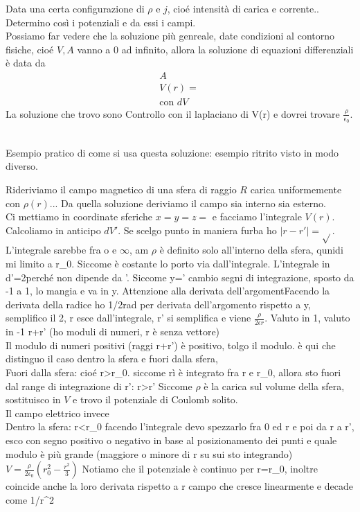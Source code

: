 \begin{equatino*}
Data una certa configurazione di $\rho$ e $j$, cioé intensità di carica e corrente.. Determino così i potenziali e da essi i campi.\\

Possiamo far vedere che la soluzione più genreale, date condizioni al contorno fisiche, cioé $V,A$ vanno a $0$ ad infinito, allora la soluzione di equazioni differenziali è data da
\begin{gather*}
	A\\
	V(r)=\frac{}{}\\
	\text{con } dV
	
\end{gather*}
La soluzione che trovo sono 
Controllo con il laplaciano di V(r) e dovrei trovare $\frac{\rho}{\epsilon_0}$.

\\

Esempio pratico di come si usa questa soluzione: esempio ritrito visto in modo diverso. 
\begin{example}
	Rideriviamo il campo magnetico di una sfera di raggio $R$ carica uniformemente con $\rho(r)..$. Da quella soluzione deriviamo il campo sia interno sia esterno.\\
	Ci mettiamo in coordinate sferiche $x= y= z=$ e facciamo l'integrale $V(r)$. Calcoliamo in anticipo $dV'$. Se scelgo punto in maniera furba ho $|r-r'|=\sqrt{}$. L'integrale sarebbe fra o e $\infty$, am $\rho$ è definito solo all'interno della sfera, qunidi mi limito a r_0. Siccome \rho è costante lo porto via dall'integrale. L'integrale in d\phi'=2\pi perché non dipende da \phi'. Siccome y=\cos\theta'  cambio segni di integrazione, sposto da -1 a 1, lo mangia e va in y. Attenzione alla derivata dell'argomentFacendo la derivata della radice ho 1/2rad per derivata dell'argomento rispetto a y, semplifico il 2, r esce dall'integrale, r' si semplifica e viene $\frac{\rho}{2\epsilon r}$. Valuto in 1, valuto in -1 r+r'  (ho moduli di numeri, r è senza vettore)\\
	Il modulo di numeri positivi (raggi r+r') è positivo, tolgo il modulo. è qui che distinguo il caso dentro la sfera e fuori dalla sfera,	\\
	Fuori dalla sfera:  cioé r>r_0. siccome rì è integrato fra r e r_0, allora sto fuori dal range di integrazione di r': r>r'
	Siccome $\rho$ è la carica sul volume della sfera, sostituisco in $V$ e trovo il potenziale di Coulomb solito. \\
	Il campo elettrico invece
	\\
	Dentro la sfera: r<r_0 facendo l'integrale devo spezzarlo fra 0 ed r e poi da r a r', esco con segno positivo o negativo in base al posizionamento dei punti e quale modulo è più grande (maggiore  o minore di r su sui sto integrando)		$V=\frac{\rho}{2\epsilon_0}\left( r_0^2 - \frac{r^2}{3} \right)$
	Notiamo che il potenziale è continuo per r=r_0, inoltre coincide anche la loro derivata rispetto a r 		campo che cresce linearmente e decade come 1/r^2
	

\end{example}
\end{equatino*}
